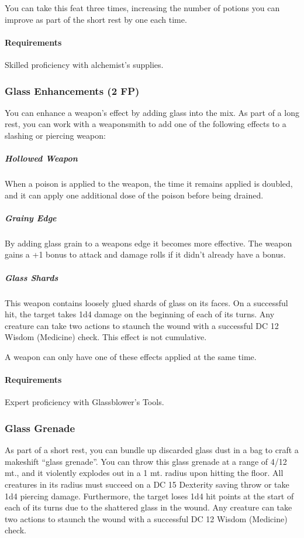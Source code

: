     You can take this feat three times, increasing the number of potions you can improve as part of the short rest by one each time.
    \paragraph{Requirements} Skilled proficiency with alchemist's supplies.
\subsubsection{Glass Enhancements (2 FP)} \label{feat::glassenhancement}
    You can enhance a weapon's effect by adding glass into the mix.
    As part of a long rest, you can work with a weaponsmith to add one of the following effects to a slashing or piercing weapon:
    \subparagraph{Hollowed Weapon} When a poison is applied to the weapon, the time it remains applied is doubled, and it can apply one additional dose of the poison before being drained.
    \subparagraph{Grainy Edge} By adding glass grain to a weapons edge it becomes more effective.
    The weapon gains a +1 bonus to attack and damage rolls if it didn't already have a bonus.
    \subparagraph{Glass Shards} This weapon contains loosely glued shards of glass on its faces.
    On a successful hit, the target takes 1d4 damage on the beginning of each of its turns.
    Any creature can take two actions to staunch the wound with a successful DC 12 Wisdom (Medicine) check.
    This effect is not cumulative.

    A weapon can only have one of these effects applied at the same time.
    \paragraph{Requirements} Expert proficiency with Glassblower's Tools.
\subsubsection{Glass Grenade} \label{feat::glassgrenade}
    As part of a short rest, you can bundle up discarded glass dust in a bag to craft a makeshift ``glass grenade''.
    You can throw this glass grenade at a range of 4/12 mt., and it violently explodes out in a 1 mt. radius upon hitting the floor.
    All creatures in its radius must succeed on a DC 15 Dexterity saving throw or take 1d4 piercing damage.
    Furthermore, the target loses 1d4 hit points at the start of each of its turns due to the shattered glass in the wound.
    Any creature can take two actions to staunch the wound with a successful DC 12 Wisdom (Medicine) check.

